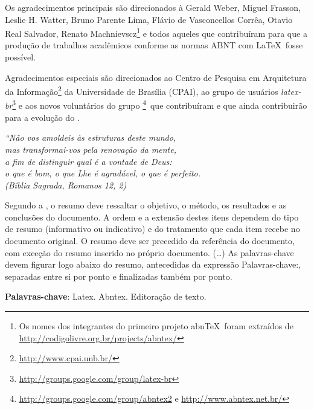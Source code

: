 \documentclass[
12pt,				%
openright,			%
twoside,			%
a4paper,			%
chapter=TITLE,		%
english,			%
brazil				%
]{abntex2}
\begin{document}
\begin{agradecimentos}
Os agradecimentos principais são direcionados à Gerald Weber, Miguel Frasson,
Leslie H. Watter, Bruno Parente Lima, Flávio de Vasconcellos Corrêa, Otavio Real
Salvador, Renato Machnievscz\footnote{Os nomes dos integrantes do primeiro
projeto abn\TeX\ foram extraídos de
\url{http://codigolivre.org.br/projects/abntex/}} e todos aqueles que
contribuíram para que a produção de trabalhos acadêmicos conforme
as normas ABNT com \LaTeX\ fosse possível.

Agradecimentos especiais são direcionados ao Centro de Pesquisa em Arquitetura
da Informação\footnote{\url{http://www.cpai.unb.br/}} da Universidade de
Brasília (CPAI), ao grupo de usuários
\emph{latex-br}\footnote{\url{http://groups.google.com/group/latex-br}} e aos
novos voluntários do grupo
\emph{\abnTeX}\footnote{\url{http://groups.google.com/group/abntex2} e
\url{http://www.abntex.net.br/}}~que contribuíram e que ainda
contribuirão para a evolução do \abnTeX.

\end{agradecimentos}

\begin{epigrafe}
    \vspace*{\fill}
	\begin{flushright}
		\textit{``Não vos amoldeis às estruturas deste mundo, \\
		mas transformai-vos pela renovação da mente, \\
		a fim de distinguir qual é a vontade de Deus: \\
		o que é bom, o que Lhe é agradável, o que é perfeito.\\
		(Bíblia Sagrada, Romanos 12, 2)}
	\end{flushright}
\end{epigrafe}


\setlength{\absparsep}{18pt} %
\begin{resumo}
 Segundo a \textcite{NBR6028:2003}, o resumo deve ressaltar o
 objetivo, o método, os resultados e as conclusões do documento. A ordem e a extensão
 destes itens dependem do tipo de resumo (informativo ou indicativo) e do
 tratamento que cada item recebe no documento original. O resumo deve ser
 precedido da referência do documento, com exceção do resumo inserido no
 próprio documento. (\ldots) As palavras-chave devem figurar logo abaixo do
 resumo, antecedidas da expressão Palavras-chave:, separadas entre si por
 ponto e finalizadas também por ponto.
 
 \textbf{Palavras-chave}: Latex. Abntex. Editoração de texto.
\end{resumo}
\end{document}
